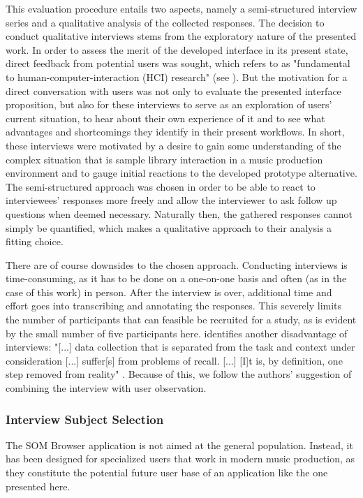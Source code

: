 This evaluation procedure entails two aspects, namely a semi-structured
interview series and a qualitative analysis of the collected responses. The
decision to conduct qualitative interviews stems from the exploratory nature of
the presented work. In order to assess the merit of the developed interface in
its present state, direct feedback from potential users was sought, which
\citet{lazar2017} refers to as "fundamental to human-computer-interaction (HCI)
research" (see \citet[p.187]{lazar2017}). But the motivation for a direct
conversation with users was not only to evaluate the presented interface
proposition, but also for these interviews to serve as an exploration of users'
current situation, to hear about their own experience of it and to see what
advantages and shortcomings they identify in their present workflows. In short,
these interviews were motivated by a desire to gain some understanding of the
complex situation that is sample library interaction in a music production
environment and to gauge initial reactions to the developed prototype
alternative. The semi-structured approach was chosen in order to be able to
react to interviewees' responses more freely and allow the interviewer to ask
follow up questions when deemed necessary. Naturally then, the gathered
responses cannot simply be quantified, which makes a qualitative approach to
their analysis a fitting choice.

\smallskip

There are of course downsides to the chosen approach. Conducting
interviews is time-consuming, as it has to be done on a one-on-one basis and
often (as in the case of this work) in person. After the interview is over,
additional time and effort goes into transcribing and annotating the responses.
This severely limits the number of participants that can feasible be recruited
for a study, as is evident by the small number of five participants here.
\citet{lazar2017} identifies another disadvantage of interviews: "[...] data
collection that is separated from the task and context under consideration [...]
suffer[s] from problems of recall. [...] [I]t is, by definition, one step
removed from reality" \citep[p.188ff.]{lazar2017}. Because of this, we follow
the authors' suggestion of combining the interview with user observation.

\subsubsection{Interview Subject Selection}
\label{subsubsec:subject_selection}
The SOM Browser application is not aimed at the general population. Instead, it
has been designed for specialized users that work in modern music production, as
they constitute the potential future user base of an application like the one
presented here.

